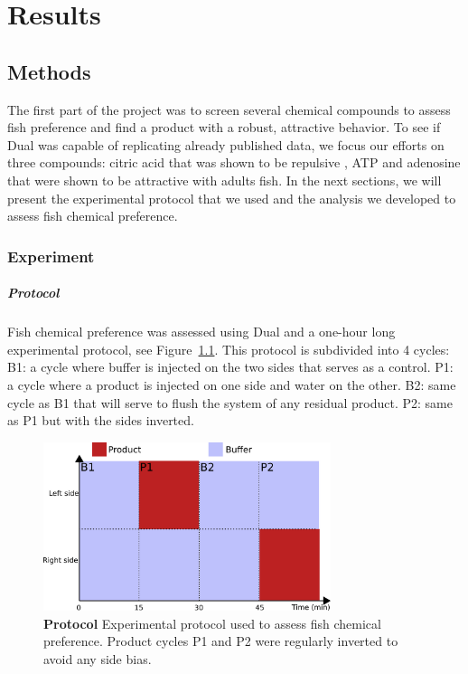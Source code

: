 \chapter{Results}
  \section{Methods}
  The first part of the project was to screen several chemical compounds to assess fish preference and find a product with a robust, attractive behavior. To see if Dual was capable of replicating already published data, we focus our efforts on three compounds: citric acid that was shown to be repulsive \cite{}, ATP and adenosine that were shown to be attractive \cite{} with adults fish. In the next sections, we will present the experimental protocol that we used and the analysis we developed to assess fish chemical preference.

  \subsection{Experiment}
  \paragraph{Protocol} Fish chemical preference was assessed using Dual and a one-hour long experimental protocol, see Figure~\ref{exp_protocol}. This protocol is subdivided into 4 cycles:
  B1: a cycle where buffer is injected on the two sides that serves as a control.
  P1: a cycle where a product is injected on one side and water on the other.
  B2: same cycle as B1 that will serve to flush the system of any residual product.
  P2: same as P1 but with the sides inverted.

    \begin{figure}[h]
      \centering
      \includegraphics[width=0.75\textwidth]{part_2/assets/protocol.png}
      \caption{\textbf{Protocol} Experimental protocol used to assess fish chemical preference. Product cycles P1 and P2 were regularly inverted to avoid any side bias.}
      \label{exp_protocol}
    \end{figure}

